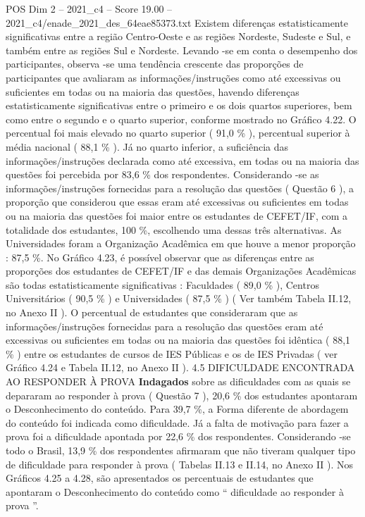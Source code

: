 \begin{textsample}{POS Dim 2 – 2021\_c4 – Score 19.00 – 2021\_c4/enade\_2021\_des\_64eae85373.txt}
Existem diferenças estatisticamente significativas entre a região Centro-Oeste e as regiões Nordeste, Sudeste e Sul, e também entre as regiões Sul e Nordeste.
Levando -se em conta o desempenho dos participantes, observa -se uma tendência crescente das proporções de participantes que avaliaram as informações/instruções como até excessivas ou suficientes em todas ou na maioria das questões, havendo diferenças estatisticamente significativas entre o primeiro e os dois quartos superiores, bem como entre o segundo e o quarto superior, conforme mostrado no Gráfico 4.22.
O percentual foi mais elevado no quarto superior ( 91,0 \% ), percentual superior à média nacional ( 88,1 \% ).
Já no quarto inferior, a suficiência das informações/instruções declarada como até excessiva, em todas ou na maioria das questões foi percebida por 83,6 \% dos respondentes.
Considerando -se as informações/instruções fornecidas para a resolução das questões ( Questão 6 ), a proporção que considerou que essas eram até excessivas ou suficientes em todas ou na maioria das questões foi maior entre os estudantes de CEFET/IF, com a totalidade dos estudantes, 100 \%, escolhendo uma dessas três alternativas.
As Universidades foram a Organização Acadêmica em que houve a menor proporção : 87,5 \%.
No Gráfico 4.23, é possível observar que as diferenças entre as proporções dos estudantes de CEFET/IF e das demais Organizações Acadêmicas são todas estatisticamente significativas : Faculdades ( 89,0 \% ), Centros Universitários ( 90,5 \% ) e Universidades ( 87,5 \% ) ( Ver também Tabela II.12, no Anexo II ).
O percentual de estudantes que consideraram que as informações/instruções fornecidas para a resolução das questões eram até excessivas ou suficientes em todas ou na maioria das questões foi idêntica ( 88,1 \% ) entre os estudantes de cursos de IES Públicas e os de IES Privadas ( ver Gráfico 4.24 e Tabela II.12, no Anexo II ). 4.5 DIFICULDADE ENCONTRADA AO RESPONDER À PROVA \textbf{Indagados} sobre as dificuldades com as quais se depararam ao responder à prova ( Questão 7 ), 20,6 \% dos estudantes apontaram o Desconhecimento do conteúdo.
Para 39,7 \%, a Forma diferente de abordagem do conteúdo foi indicada como dificuldade.
Já a falta de motivação para fazer a prova foi a dificuldade apontada por 22,6 \% dos respondentes.
Considerando -se todo o Brasil, 13,9 \% dos respondentes afirmaram que não tiveram qualquer tipo de dificuldade para responder à prova ( Tabelas II.13 e II.14, no Anexo II ).
Nos Gráficos 4.25 a 4.28, são apresentados os percentuais de estudantes que apontaram o Desconhecimento do conteúdo como “ dificuldade ao responder à prova ”.

\end{textsample}
